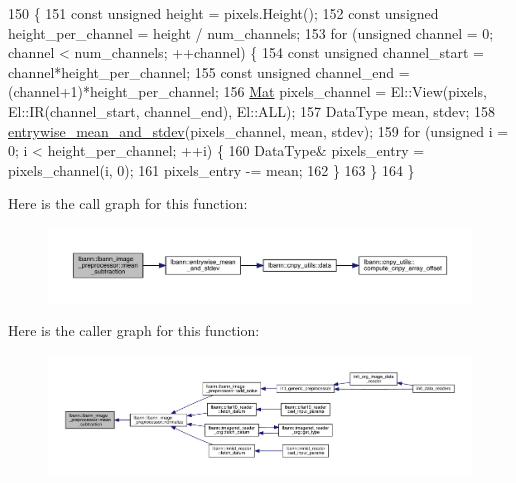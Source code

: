 \begin{DoxyCode}
150                            \{
151   \textcolor{keyword}{const} \textcolor{keywordtype}{unsigned} height = pixels.Height();
152   \textcolor{keyword}{const} \textcolor{keywordtype}{unsigned} height\_per\_channel = height / num\_channels;
153   \textcolor{keywordflow}{for} (\textcolor{keywordtype}{unsigned} channel = 0; channel < num\_channels; ++channel) \{
154     \textcolor{keyword}{const} \textcolor{keywordtype}{unsigned} channel\_start = channel*height\_per\_channel;
155     \textcolor{keyword}{const} \textcolor{keywordtype}{unsigned} channel\_end = (channel+1)*height\_per\_channel;
156     \hyperlink{base_8hpp_a68f11fdc31b62516cb310831bbe54d73}{Mat} pixels\_channel = El::View(pixels, El::IR(channel\_start, channel\_end), El::ALL);
157     DataType mean, stdev;
158     \hyperlink{namespacelbann_a604ae9da0173b8be2bfb6877997d6d5c}{entrywise\_mean\_and\_stdev}(pixels\_channel, mean, stdev);
159     \textcolor{keywordflow}{for} (\textcolor{keywordtype}{unsigned} i = 0; i < height\_per\_channel; ++i) \{
160       DataType& pixels\_entry = pixels\_channel(i, 0);
161       pixels\_entry -= mean;
162     \}
163   \}
164 \}
\end{DoxyCode}
Here is the call graph for this function\+:\nopagebreak
\begin{figure}[H]
\begin{center}
\leavevmode
\includegraphics[width=350pt]{classlbann_1_1lbann__image__preprocessor_ab499dd9f11d98998b5902d639f70fa8e_cgraph}
\end{center}
\end{figure}
Here is the caller graph for this function\+:\nopagebreak
\begin{figure}[H]
\begin{center}
\leavevmode
\includegraphics[width=350pt]{classlbann_1_1lbann__image__preprocessor_ab499dd9f11d98998b5902d639f70fa8e_icgraph}
\end{center}
\end{figure}
\mbox{\label{classlbann_1_1lbann__image__preprocessor_ae370cdc9f776ce8cce94a45cacf47425}} 
